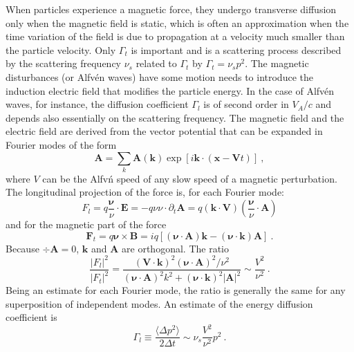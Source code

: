 \documentclass[12pt,a4paper]{article}
\renewcommand{\vec}[1]{\boldsymbol{#1}}
\begin{document}
When particles experience a magnetic force, they undergo transverse diffusion only when the magnetic field is static, which is often an approximation when the time variation of the field is due to propagation at a velocity much smaller than the particle velocity. Only $\Gamma_t$ is important and is a scattering process described by the scattering frequency $\nu_s$ related to $\Gamma_t$ by $\Gamma_t = \nu_s p^2$. The magnetic disturbances (or Alfv\'en waves) have some motion needs to introduce the induction electric field that modifies the particle energy. In the case of Alfv\'en waves, for instance, the diffusion coefficient $\Gamma_l$ is of second order in $V_A/c$ and depends also essentially on the scattering frequency. The magnetic field and the electric field are derived from the vector potential that can be expanded in Fourier modes of the form
\begin{equation}
\vec{A} = \sum_k \vec{A} (\vec{k}) \exp [i\vec{k} \cdot (\vec{x} -\vec{V} t)] ~,
\end{equation}
where $V$ can be the Alfv\'n speed of any slow speed of a magnetic perturbation. The longitudinal projection of the force is, for each Fourier mode:
\begin{equation}
F_l = q\frac{\vec{\nu}}{\nu} \cdot \vec{E} = -q \nu \nu\cdot \partial_t \vec{A} = q (\vec{k} \cdot \vec{V}) \left(\frac{\vec{\nu}}{\nu} \cdot \vec{A} \right)
\end{equation}
and for the magnetic part of the force
\begin{equation}
\vec{F}_t = q\vec{\nu} \times \vec{B} = iq[(\vec{\nu} \cdot \vec{A})\vec{k} -(\vec{\nu} \cdot \vec{k})\vec{A}] ~.
\end{equation}
Because $\div \vec{A} = 0$, $\vec{k}$ and $\vec{A}$ are orthogonal. The ratio
\begin{equation}
\frac{|F_l|^2}{|F_t|^2} = \frac{(\vec{V} \cdot \vec{k})^2 (\vec{\nu} \cdot \vec{A})^2/\nu^2}{(\vec{\nu} \cdot \vec{A})^2k^2 +(\vec{\nu} \cdot \vec{k})^2|\vec{A}|^2} \sim \frac{V^2}{\nu^2} ~.
\end{equation}
Being an estimate for each Fourier mode, the ratio is generally the same for any superposition of independent modes.  An estimate of the energy diffusion coefficient is
\begin{equation}
\Gamma_l \equiv \frac{\langle \Delta p^2 \rangle}{2\Delta t}  \sim \nu_s \frac{V^2}{\nu^2} p^2 ~.
\end{equation}
\end{document}
